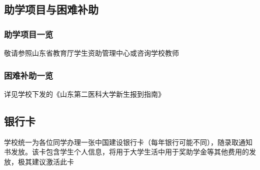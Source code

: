 \subsection[助学项目与困难补助]{助学项目与困难补助}
\subsubsection[助学项目一览]{助学项目一览}
敬请参照山东省教育厅学生资助管理中心或咨询学校教师
\subsubsection[困难补助一览]{困难补助一览}
详见学校下发的《山东第二医科大学新生报到指南》

\subsection[银行卡]{银行卡}
学校统一为各位同学办理一张中国建设银行卡（每年银行可能不同），随录取通知书发放。该卡包含学生个人信息，将用于大学生活中用于奖助学金等其他费用的发放，极其建议激活此卡

\textbf{}
